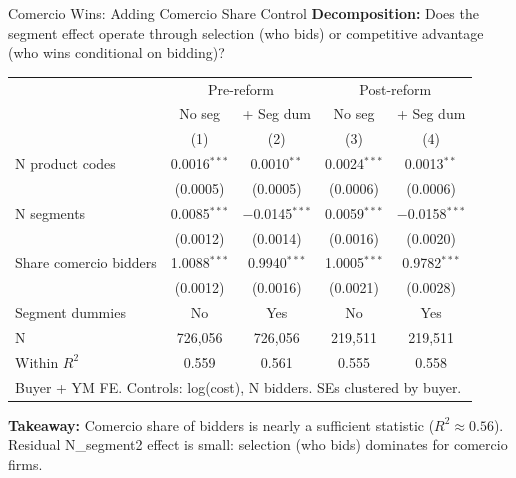 \documentclass[9pt,aspectratio=169]{beamer}
\begin{document}
\begin{frame}{Comercio Wins: Adding Comercio Share Control}
\textbf{Decomposition:} Does the segment effect operate through selection (who bids) or competitive advantage (who wins conditional on bidding)?

\centering\small
\begin{tabular}{lcccc}
\toprule
 & \multicolumn{2}{c}{Pre-reform} & \multicolumn{2}{c}{Post-reform} \\
 & No seg & + Seg dum & No seg & + Seg dum \\
 & (1) & (2) & (3) & (4) \\
\midrule
N product codes & 0.0016$^{***}$ & 0.0010$^{**}$ & 0.0024$^{***}$ & 0.0013$^{**}$ \\
 & (0.0005) & (0.0005) & (0.0006) & (0.0006) \\[2pt]
N segments & 0.0085$^{***}$ & $-$0.0145$^{***}$ & 0.0059$^{***}$ & $-$0.0158$^{***}$ \\
 & (0.0012) & (0.0014) & (0.0016) & (0.0020) \\[2pt]
Share comercio bidders & 1.0088$^{***}$ & 0.9940$^{***}$ & 1.0005$^{***}$ & 0.9782$^{***}$ \\
 & (0.0012) & (0.0016) & (0.0021) & (0.0028) \\[2pt]
\midrule
Segment dummies & No & Yes & No & Yes \\
N & 726,056 & 726,056 & 219,511 & 219,511 \\
Within $R^2$ & 0.559 & 0.561 & 0.555 & 0.558 \\
\bottomrule
\multicolumn{5}{l}{\footnotesize Buyer + YM FE. Controls: log(cost), N bidders. SEs clustered by buyer.} \\
\end{tabular}

\bigskip
\small\textbf{Takeaway:} Comercio share of bidders is nearly a sufficient statistic ($R^2 \approx 0.56$). \\
Residual N\_segment2 effect is small: selection (who bids) dominates for comercio firms.
\end{frame}
\end{document}
